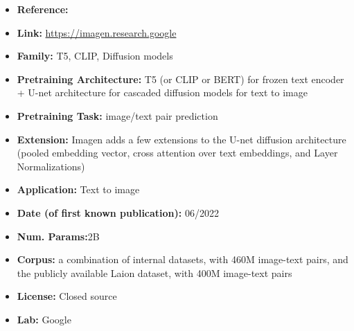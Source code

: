 \documentclass{article}
\begin{document}
            \begin{itemize}
                \item \textbf{Reference:} 
                \item \textbf{Link:} \url{https://imagen.research.google}
                \item \textbf{Family:} T5, CLIP, Diffusion models 
                \item \textbf{Pretraining Architecture:} T5 (or CLIP or BERT) for frozen text encoder + U-net architecture for cascaded diffusion models for text to image
                \item \textbf{Pretraining Task:} image/text pair prediction
                \item \textbf{Extension:} Imagen adds a few extensions to the U-net diffusion architecture (pooled embedding vector, cross attention over text embeddings, and Layer Normalizations)  
                \item \textbf{Application:} Text to image
                \item \textbf{Date (of first known publication):} 06/2022
                \item \textbf{Num. Params:}2B
                \item \textbf{Corpus:} a combination of internal datasets, with 460M image-text pairs, and the publicly available Laion dataset, with 400M image-text pairs
                \item \textbf{License:} Closed source
                \item \textbf{Lab:} Google
            \end{itemize}
\end{document}
